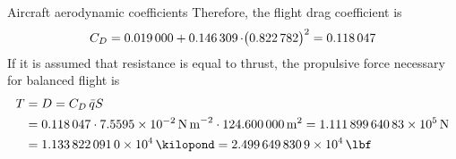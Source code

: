 \documentclass[[12pt,twoside]{book}
\begin{document}
\begin{myExampleX}{Aircraft aerodynamic coefficients } {}
%
\noindent
Therefore, the flight drag coefficient
is
\[
C_D
  = \SI[round-precision=4]{\myDragCoefficientZero}{}
    + 
      \SI[round-precision=4]{\myKpolar} 
        \cdot \big( \SI[round-precision=3]{\myLiftCoefficient}{} \big)^2
  =\SI[round-precision=4]{\myDragCoefficient}{}
 \]
%
If it is assumed that resistance is equal to thrust,
the propulsive force necessary for balanced flight is
\[
\begin{split}
T & {}= D = C_D \, \bar{q} S
\\
  & {}= \SI[round-precision=4]{\myDragCoefficient}{}
    \cdot \SI[round-precision=3,scientific-notation=true]{\myDynamicPressureBar}{\newton\,\meter^{-2}}
    \cdot \SI[round-precision=1]{\myWingSurfaceMTSD}{\meter^2}
  = { \SI[round-precision=3,scientific-notation=true]{\myDragN}{\newton} }
\\
  & {}= { \SI[round-precision=3,scientific-notation=true]{\myDragKgf}{\kilopond} }
  = { \SI[round-precision=3,scientific-notation=true]{\myDragLbf}{\lbf} }
\end{split}
\]
\end{myExampleX}
\end{document}

